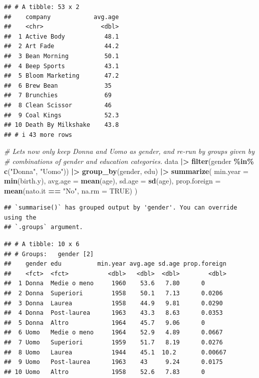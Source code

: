 \documentclass[
]{book}
\newenvironment{Shaded}{\begin{snugshade}}{\end{snugshade}}
\newcommand{\AttributeTok}[1]{\textcolor[rgb]{0.13,0.29,0.53}{#1}}
\newcommand{\CommentTok}[1]{\textcolor[rgb]{0.56,0.35,0.01}{\textit{#1}}}
\newcommand{\ConstantTok}[1]{\textcolor[rgb]{0.56,0.35,0.01}{#1}}
\newcommand{\FunctionTok}[1]{\textcolor[rgb]{0.13,0.29,0.53}{\textbf{#1}}}
\newcommand{\NormalTok}[1]{#1}
\newcommand{\SpecialCharTok}[1]{\textcolor[rgb]{0.81,0.36,0.00}{\textbf{#1}}}
\newcommand{\StringTok}[1]{\textcolor[rgb]{0.31,0.60,0.02}{#1}}
\begin{document}
\begin{verbatim}
## # A tibble: 53 x 2
##    company            avg.age
##    <chr>                <dbl>
##  1 Active Body           48.1
##  2 Art Fade              44.2
##  3 Bean Morning          50.1
##  4 Beep Sports           43.1
##  5 Bloom Marketing       47.2
##  6 Brew Bean             35  
##  7 Brunchies             69  
##  8 Clean Scissor         46  
##  9 Coal Kings            52.3
## 10 Death By Milkshake    43.8
## # i 43 more rows
\end{verbatim}

\begin{Shaded}
\begin{Highlighting}[]
\CommentTok{\# Let\textquotesingle{}s now only keep Donna and Uomo as gender, and re{-}run by groups given by }
\CommentTok{\# combinations of gender and education categories.}
\NormalTok{data }\SpecialCharTok{|\textgreater{}} 
  \FunctionTok{filter}\NormalTok{(gender }\SpecialCharTok{\%in\%} \FunctionTok{c}\NormalTok{(}\StringTok{"Donna"}\NormalTok{, }\StringTok{"Uomo"}\NormalTok{)) }\SpecialCharTok{|\textgreater{}} 
  \FunctionTok{group\_by}\NormalTok{(gender, edu) }\SpecialCharTok{|\textgreater{}} 
  \FunctionTok{summarize}\NormalTok{(}
    \AttributeTok{min.year =} \FunctionTok{min}\NormalTok{(birth.y),}
    \AttributeTok{avg.age =} \FunctionTok{mean}\NormalTok{(age),}
    \AttributeTok{sd.age =} \FunctionTok{sd}\NormalTok{(age),}
    \AttributeTok{prop.foreign =} \FunctionTok{mean}\NormalTok{(nato.it }\SpecialCharTok{==} \StringTok{"No"}\NormalTok{, }\AttributeTok{na.rm =} \ConstantTok{TRUE}\NormalTok{)}
\NormalTok{  )}
\end{Highlighting}
\end{Shaded}

\begin{verbatim}
## `summarise()` has grouped output by 'gender'. You can override using the
## `.groups` argument.
\end{verbatim}

\begin{verbatim}
## # A tibble: 10 x 6
## # Groups:   gender [2]
##    gender edu          min.year avg.age sd.age prop.foreign
##    <fct>  <fct>           <dbl>   <dbl>  <dbl>        <dbl>
##  1 Donna  Medie o meno     1960    53.6   7.80      0      
##  2 Donna  Superiori        1958    50.1   7.13      0.0206 
##  3 Donna  Laurea           1958    44.9   9.81      0.0290 
##  4 Donna  Post-laurea      1963    43.3   8.63      0.0353 
##  5 Donna  Altro            1964    45.7   9.06      0      
##  6 Uomo   Medie o meno     1964    52.9   4.89      0.0667 
##  7 Uomo   Superiori        1959    51.7   8.19      0.0276 
##  8 Uomo   Laurea           1944    45.1  10.2       0.00667
##  9 Uomo   Post-laurea      1963    43     9.24      0.0175 
## 10 Uomo   Altro            1958    52.6   7.83      0
\end{verbatim}
\end{document}
